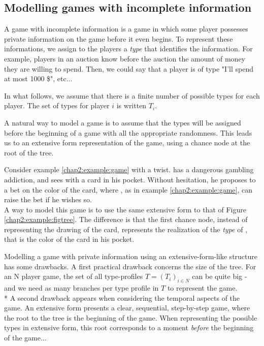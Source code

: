 \subsection{Modelling games with incomplete information}

A game with incomplete information is a game in which some player possesses private information on the game before it even begins. To represent these  informations, we assign to the players a \emph{type} that identifies the information. For example, players in an auction know before the auction the amount of money they are willing to spend. Then, we could say that a player is of type "I'll spend at most 1000 \$", etc...

 In what follows, we assume that there is a finite number of possible types for each player. The set of types for player $i$ is written $T_i$.

A natural way to model a game is to assume that the types will be assigned before the beginning of a game with all the appropriate randomness. This leads us to an extensive form representation of the game, using a chance node at the root of the tree.
\begin{example}
Consider example \ref{chap2:example:game} with a twist. \TAone{} has a dangerous gambling addiction, and sees \TAtwo{} with a card in his pocket.  Without hesitation, he proposes to \TAtwo{} a bet on the color of the card, where \TAtwo{}, as in example \ref{chap2:example:game}, can raise the bet if he wishes so.\\
A way to model this game is to use the same extensive form to that of Figure \ref{chap2:example:figtree}. The difference is that the first chance node, instead of representing the drawing of the card, represents the realization of the \emph{type} of \TAtwo{}, that is the color of the card in his pocket.
\label{ch2:exbayintro}
\end{example}

Modelling a game with private information using an extensive-form-like structure has some drawbacks. 
A first practical drawback concerns the size of the tree. For an N player game, the set of all type-profiles $T = (T_i)_{i \in N}$ can be quite big - and we need as many branches per type profile in $T$ to represent the game. \\*
A second drawback appears when considering the temporal aspects of the game.
An extensive form presents a clear, sequential, step-by-step game, where the root to the tree is the beginning of the game. When representing the possible types in extensive form, this root corresponds to a moment \emph{before} the beginning of the game...

